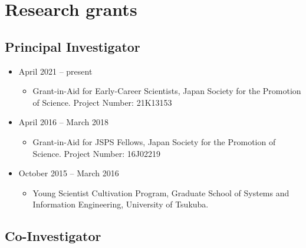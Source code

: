 \documentclass[
]{book}
\providecommand{\tightlist}{%
  \setlength{\itemsep}{0pt}\setlength{\parskip}{0pt}}
\begin{document}
\hypertarget{research-grants}{%
\section*{Research grants}\label{research-grants}}

\hypertarget{principal-investigator}{%
\subsection*{Principal Investigator}\label{principal-investigator}}

\begin{itemize}
\tightlist
\item
  April 2021 -- present

  \begin{itemize}
  \tightlist
  \item
    Grant-in-Aid for Early-Career Scientists,
    Japan Society for the Promotion of Science.
    Project Number: 21K13153
  \end{itemize}
\item
  April 2016 -- March 2018

  \begin{itemize}
  \tightlist
  \item
    Grant-in-Aid for JSPS Fellows,
    Japan Society for the Promotion of Science.
    Project Number: 16J02219
  \end{itemize}
\item
  October 2015 -- March 2016

  \begin{itemize}
  \tightlist
  \item
    Young Scientist Cultivation Program,
    Graduate School of Systems and Information Engineering, University of Tsukuba.
  \end{itemize}
\end{itemize}

\hypertarget{co-investigator}{%
\subsection*{Co-Investigator}\label{co-investigator}}
\end{document}
